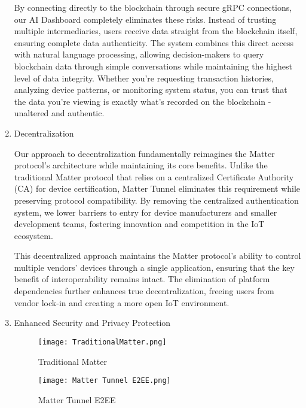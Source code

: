 \documentclass[conference]{IEEEtran}
\begin{document}
\begin{enumerate}[itemsep=2ex, parsep=1ex]
        By connecting directly to the blockchain through secure gRPC connections, our AI Dashboard completely eliminates these risks. Instead of trusting multiple intermediaries, users receive data straight from the blockchain itself, ensuring complete data authenticity. The system combines this direct access with natural language processing, allowing decision-makers to query blockchain data through simple conversations while maintaining the highest level of data integrity. Whether you're requesting transaction histories, analyzing device patterns, or monitoring system status, you can trust that the data you're viewing is exactly what's recorded on the blockchain - unaltered and authentic.
	      
	      	      	      
	\item Decentralization
	      	      	      
	      Our approach to decentralization fundamentally reimagines the Matter
	      protocol's architecture while maintaining its core benefits. Unlike the traditional
	      Matter protocol that relies on a centralized Certificate Authority (CA) for
	      device certification, Matter Tunnel eliminates this requirement while
	      preserving protocol compatibility. By removing the centralized authentication
	      system, we lower barriers to entry for device manufacturers and smaller
	      development teams, fostering innovation and competition in the IoT ecosystem.
	      	      	      
	      This decentralized approach maintains the Matter protocol's ability to control
	      multiple vendors' devices through a single application, ensuring that the key
	      benefit of interoperability remains intact. The elimination of platform
	      dependencies further enhances true decentralization, freeing users from vendor
	      lock-in and creating a more open IoT environment.
	      	      	      
	\item Enhanced Security and Privacy Protection
	      	      	      
	      \begin{figure}[h!]
	      	\centering
	      	\texttt{[image: TraditionalMatter.png]}
	      	\caption{Traditional Matter}
	      	\label{fig:TraditionalMatter}
	      \end{figure}
	      	      	      
	      \begin{figure}[h!]
	      	\centering
	      	\texttt{[image: Matter Tunnel E2EE.png]}
	      	\caption{Matter Tunnel E2EE}
	      	\label{fig:MatterTunnelE2EE}
	      \end{figure}
	      	      	      

\end{enumerate}
\end{document}
